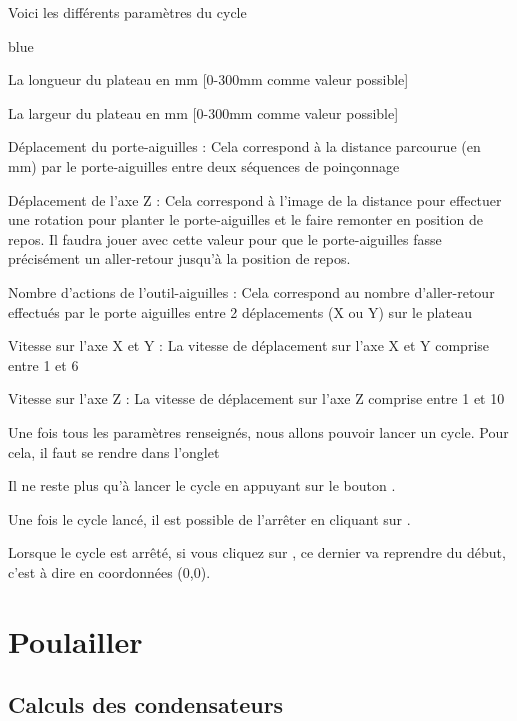 {

Voici les différents paramètres du cycle
\begin{items}{blue}{\Triangle}
    \item La longueur du plateau en mm [0-300mm comme valeur possible]
    \item La largeur du plateau en mm [0-300mm comme valeur possible]
    \item Déplacement du porte-aiguilles : Cela correspond à la distance parcourue (en mm) par le porte-aiguilles entre deux séquences de poinçonnage
    \item Déplacement de l'axe Z : Cela correspond à l'image de la distance pour effectuer une rotation pour planter le porte-aiguilles et le faire remonter en position de repos. Il faudra jouer avec cette valeur pour que le porte-aiguilles fasse précisément un aller-retour jusqu'à la position de repos.
    \item Nombre d'actions de l'outil-aiguilles : Cela correspond au nombre d'aller-retour effectués par le porte aiguilles entre 2 déplacements (X ou Y) sur le plateau
    \item Vitesse sur l'axe X et Y : La vitesse de déplacement sur l'axe X et Y comprise entre 1 et 6
    \item Vitesse sur l'axe Z : La vitesse de déplacement sur l'axe Z comprise entre 1 et 10
\end{items}

Une fois tous les paramètres renseignés, nous allons pouvoir lancer un cycle. Pour cela, il faut se rendre dans l'onglet 

Il ne reste plus qu'à lancer le cycle en appuyant sur le bouton .


Une fois le cycle lancé, il est possible de l’arrêter en cliquant sur .


Lorsque le cycle est arrêté, si vous cliquez sur , ce dernier va reprendre du début, c'est à dire en coordonnées (0,0).\chapter{Poulailler}

\section{Calculs des condensateurs}

}
